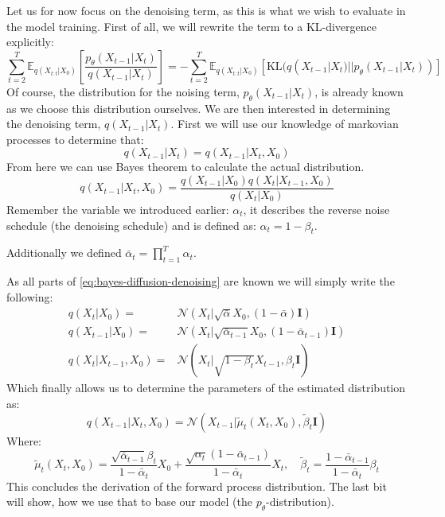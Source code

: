 \documentclass[a4paper, 12pt]{olplainarticle}
\begin{document}
Let us for now focus on the denoising term, as this is what we wish to evaluate in the model training.
First of all, we will rewrite the term to a KL-divergence explicitly:
\begin{equation} \label{eq:kl-divergence}
    \sum_{t=2}^{T}\mathbb{E}_{q(X_{t:t}|X_0)}\left[\frac{p_{\theta}(X_{t-1}|X_{t})}{q(X_{t-1}|X_{t})} \right] = - \sum_{t=2}^{T}\mathbb{E}_{q(X_{t:t}|X_0)} \left[ \text{KL} (q(X_{t-1}|X_{t}) || p_{\theta}(X_{t-1}|X_{t})) \right]
\end{equation}
Of course, the distribution for the noising term, $p_{\theta}(X_{t-1}|X_{t})$, is already known as we choose this distribution ourselves. 
We are then interested in determining the denoising term, $q(X_{t-1}|X_{t})$.
First we will use our knowledge of markovian processes to determine that:
\begin{equation}
    q(X_{t-1}|X_{t}) = q(X_{t-1}|X_{t}, X_0)
\end{equation}
From here we can use Bayes theorem to calculate the actual distribution.
\begin{equation} \label{eq:bayes-diffusion-denoising}
    q(X_{t-1}|X_{t}, X_0) = \frac{q(X_{t-1}|X_0)q(X_t|X_{t-1},X_0)}{q(X_t|X_0)}
\end{equation}
Remember the variable we introduced earlier: $\alpha_t$, it describes the reverse noise schedule (the denoising schedule) and is defined as: $\alpha_t = 1- \beta_t$.

Additionally we defined $\bar{\alpha}_t = \prod_{t=1}^{T} \alpha_t$.

As all parts of \cref{eq:bayes-diffusion-denoising} are known we will simply write the following:
\begin{align}
    q(X_t|X_0) =& \mathcal{N}(X_t| \sqrt{\bar{\alpha}}X_0, (1-\bar{\alpha})\mathbf{I}) \\
    q(X_{t-1}|X_0) =& \mathcal{N}(X_t| \sqrt{\bar{\alpha}_{t-1}}X_0, (1-\bar{\alpha}_{t-1})\mathbf{I})\\
    q(X_t|X_{t-1},X_0) =& \mathcal{N}(X_t| \sqrt{1-\beta_t}X_{t-1}, \beta_t \mathbf{I})
\end{align}
Which finally allows us to determine the parameters of the estimated distribution as:
\begin{equation} \label{eq:forward-process-distribution}
    q(X_{t-1}|X_{t}, X_0) = \mathcal{N}(X_{t-1}| \tilde{\mu}_t(X_t, X_0), \tilde{\beta}_t \mathbf{I})
\end{equation}
Where:
\begin{equation*}
    \tilde{\mu}_t(X_t, X_0) = \frac{\sqrt{\bar{\alpha}_{t-1}}\beta_t}{1-\bar{\alpha}_t}X_0 + \frac{\sqrt{\alpha_t}(1-\bar{\alpha}_{t-1})}{1-\bar{\alpha}_t}X_t, \quad \tilde{\beta}_t = \frac{1-\bar{\alpha}_{t-1}}{1-\bar{\alpha}_t}\beta_t
\end{equation*}
This concludes the derivation of the forward process distribution. 
The last bit will show, how we use that to base our model (the $p_{\theta}$-distribution).
\end{document}
